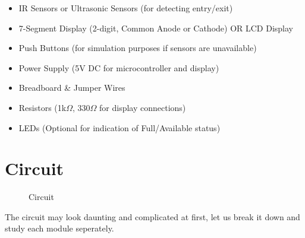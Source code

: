\documentclass{article}
\begin{document}
\begin{itemize}
    \item IR Sensors or Ultrasonic Sensors (for detecting entry/exit)
    
    \item 7-Segment Display (2-digit, Common Anode or Cathode) OR LCD Display
    
    \item Push Buttons (for simulation purposes if sensors are unavailable)
    
    \item Power Supply (5V DC for microcontroller and display)
    
    \item Breadboard \& Jumper Wires
    
    \item Resistors (1k$\Omega$, 330$\Omega$ for display connections)
    
    \item LEDs (Optional for indication of Full/Available status)


\end{itemize}

\section{Circuit}
\begin{figure}[h!]
    \centering
    \caption{Circuit}
    \label{fig:enter-label}
\end{figure}
The circuit may look daunting and complicated at first, let us break it down and study each module seperately.
\pagebreak
\end{document}
